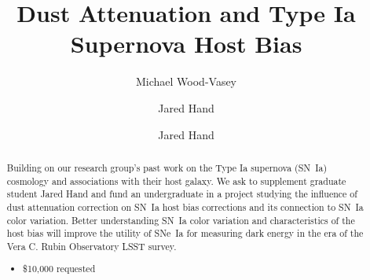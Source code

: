 \documentclass[modern]{aastex63}
\begin{document}
\title{Dust Attenuation and Type Ia Supernova Host Bias}


\author{Michael Wood-Vasey}

\author{Jared Hand}

\author{Jared Hand}

\begin{abstract}
    Building on our research group's past work on the Type Ia supernova (SN~Ia) cosmology and associations with their host galaxy.
    We ask to supplement graduate student Jared Hand and fund an undergraduate in a project studying the influence of dust attenuation correction on SN~Ia host bias corrections and its connection to SN~Ia color variation.
    Better understanding SN~Ia color variation and characteristics of the host bias will improve the utility of SNe~Ia for measuring dark energy in the era of the Vera C. Rubin Observatory LSST survey.
    \begin{itemize}
        \item \$10,000 requested
    \end{itemize}
\end{abstract}
\end{document}
